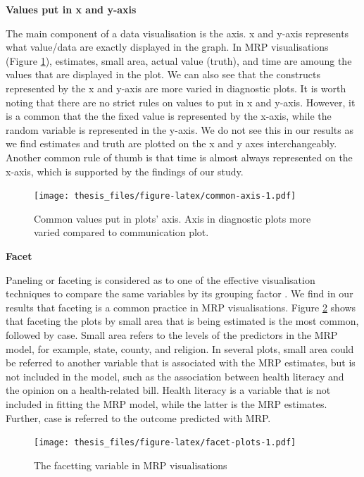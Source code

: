 \documentclass{monashthesis}
\begin{document}
\textbf{Values put in x and y-axis}

The main component of a data visualisation is the axis. x and y-axis represents what value/data are exactly displayed in the graph. In MRP visualisations (Figure \ref{fig:common-axis}), estimates, small area, actual value (truth), and time are amoung the values that are displayed in the plot. We can also see that the constructs represented by the x and y-axis are more varied in diagnostic plots. It is worth noting that there are no strict rules on values to put in x and y-axis. However, it is a common that the the fixed value is represented by the x-axis, while the random variable is represented in the y-axis. We do not see this in our results as we find estimates and truth are plotted on the x and y axes interchangeably. Another common rule of thumb is that time is almost always represented on the x-axis, which is supported by the findings of our study.

\begin{figure}
\centering
\texttt{[image: thesis\_files/figure-latex/common-axis-1.pdf]}
\caption{\label{fig:common-axis}Common values put in plots' axis. Axis in diagnostic plots more varied compared to communication plot.}
\end{figure}

\textbf{Facet}

Paneling or faceting is considered as to one of the effective visualisation techniques to compare the same variables by its grouping factor \autocite{MIDWAY2020100141}. We find in our results that faceting is a common practice in MRP visualisations. Figure \ref{fig:facet-plots} shows that faceting the plots by small area that is being estimated is the most common, followed by case. Small area refers to the levels of the predictors in the MRP model, for example, state, county, and religion. In several plots, small area could be referred to another variable that is associated with the MRP estimates, but is not included in the model, such as the association between health literacy and the opinion on a health-related bill. Health literacy is a variable that is not included in fitting the MRP model, while the latter is the MRP estimates. Further, case is referred to the outcome predicted with MRP.

\begin{figure}
\centering
\texttt{[image: thesis\_files/figure-latex/facet-plots-1.pdf]}
\caption{\label{fig:facet-plots}The facetting variable in MRP visualisations}
\end{figure}
\end{document}
